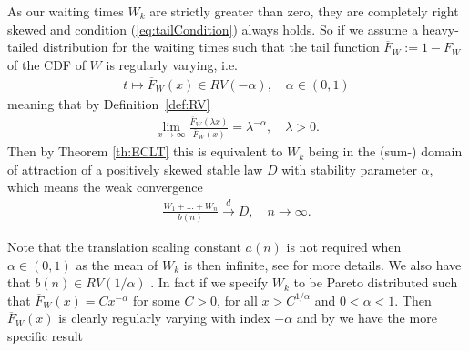 \documentclass[honours,12pt,twoside, openright]{unswthesis}
\newcommand{\1}{\mathbf 1}
\numberwithin{equation}{section}
\theoremstyle{definition}
\theoremstyle{remark}
\begin{document}
As our waiting times $W_k$ are strictly greater than zero, they are completely right skewed and condition (\ref{eq:tailCondition}) always holds. So if we assume a heavy-tailed distribution for the waiting times such that the tail function 
$\overline F_W := 1 - F_W$ of the CDF of $W$ is regularly varying, i.e.
\begin{align}
t \mapsto \overline F_W(x) \in RV(-\alpha), \quad \alpha \in (0,1)
\end{align}
meaning that by Definition~\ref{def:RV}
\begin{align*}
\lim_{x \to \infty}\frac{\overline F_W(\lambda x)}{\overline F_W(x)}
= \lambda^{-\alpha}, \quad \lambda > 0.
\end{align*}
Then by Theorem \ref{th:ECLT}
this is equivalent to $W_k$ being in the 
(sum-) domain of attraction of a positively skewed stable law $D$ with 
stability parameter $\alpha$, which means the weak convergence
\begin{align}
\frac{W_1 + \ldots + W_n}{b(n)} \overset{d}{\longrightarrow} D, \quad n \to \infty.
\end{align}

\noindent Note that the translation scaling constant $a(n)$ is not required when $\alpha\in(0,1)$ as the mean of $W_k$ is then infinite, see \cite{Whitt2010} for more details. We also have that $b(n)\in RV(1/\alpha)$ \cite[Prop~4.15]{MeerschaertSikorskii2012}. In fact if we specify $W_k$ to be Pareto distributed such that $\overline F_W(x)=Cx^{-\alpha}$ for some $C>0$, for all $x>C^{1/\alpha}$ and $0<\alpha<1$. Then $\overline F_W(x)$ is clearly regularly varying with index $-\alpha$ and by \cite[Th~3.37]{MeerschaertSikorskii2012} we have the more specific result
\end{document}
